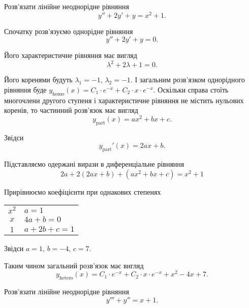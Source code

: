 \begin{example}
	Розв'язати лінійне неоднорідне рівняння \[y'' + 2 y' + y = x^2 + 1.\]
\end{example}
\begin{solution}
	Спочатку розв'язуємо однорідне рівняння
	\begin{equation*}
		y'' + 2 y' + y = 0.	
	\end{equation*}

	Його характеристичне рівняння має вигляд
	\begin{equation*}
		\lambda^2 + 2 \lambda + 1 = 0.
	\end{equation*}

	Його коренями будуть $\lambda_1 = -1$, $\lambda_2 = -1$. І загальним роз\-в'яз\-ком однорідного рівняння буде $y_{\text{homo}}(x) = C_1 \cdot e^{-x} + C_2 \cdot x \cdot e^{-x}$. Оскільки справа стоїть многочлени другого ступеня і характеристичне рівняння не містить нульових коренів, то частинний роз\-в'яз\-ок має вигляд
	\begin{equation*}
		y_{\text{part}}(x) = a x^2 + b x + c.
	\end{equation*}

	Звідси
	\begin{equation*}
		y_{\text{part}}'(x) = 2 a x + b.	
	\end{equation*}

	Підставляємо одержані вирази в диференціальне рівняння
	\begin{equation*}
		2 a + 2 (2 a x + b) + (a x^2 + b x + c) = x^2 + 1
	\end{equation*}

	Прирівнюємо коефіцієнти при однакових степенях
	\begin{table}[H]
		\centering
		\begin{tabular}{c|l}
			$x^2$ & $a = 1$ \\
			$x$ & $4 a + b = 0$ \\
			$1$ & $a + 2 b + c = 1$
		\end{tabular}
	\end{table}

	Звідси $a = 1$, $b = - 4$, $c = 7$. \parvskip

	Таким чином загальний розв'язок має вигляд
	\begin{equation*}
		y_{\text{hetero}}(x) = C_1 \cdot e^{-x} + C_2 \cdot x \cdot e^{-x} + x^2 - 4 x + 7.
	\end{equation*}
\end{solution}

\begin{example}
	Розв'язати лінійне неоднорідне рівняння \[y''' + y'' = x + 1.\]
\end{example}


